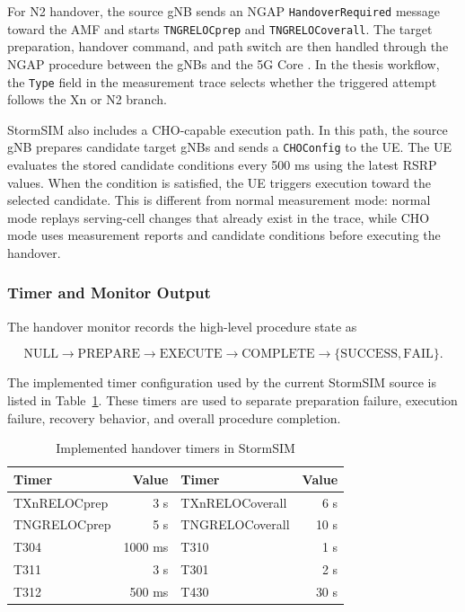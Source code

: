 For N2 handover, the source gNB sends an NGAP \texttt{HandoverRequired}
message toward the AMF and starts \texttt{TNGRELOCprep} and
\texttt{TNGRELOCoverall}. The target preparation, handover command, and path
switch are then handled through the NGAP procedure between the gNBs and the
5G Core \cite{3gpp_38413}. In the thesis workflow, the \texttt{Type} field in
the measurement trace selects whether the triggered attempt follows the Xn or
N2 branch.

StormSIM also includes a CHO-capable execution path. In this path, the source
gNB prepares candidate target gNBs and sends a \texttt{CHOConfig} to the UE.
The UE evaluates the stored candidate conditions every 500 ms using the latest
RSRP values. When the condition is satisfied, the UE triggers execution toward
the selected candidate. This is different from normal measurement mode: normal
mode replays serving-cell changes that already exist in the trace, while CHO
mode uses measurement reports and candidate conditions before executing the
handover.

\subsubsection{Timer and Monitor Output}

The handover monitor records the high-level procedure state as

\begin{equation}
\mathrm{NULL}\rightarrow\mathrm{PREPARE}\rightarrow\mathrm{EXECUTE}
\rightarrow\mathrm{COMPLETE}\rightarrow\{\mathrm{SUCCESS},\mathrm{FAIL}\}.
\end{equation}

The implemented timer configuration used by the current StormSIM source is
listed in Table~\ref{tab:stormsim-handover-timers}. These timers are used to
separate preparation failure, execution failure, recovery behavior, and overall
procedure completion.

\begin{table}[H]
\centering
\caption{Implemented handover timers in StormSIM}
\begin{tabular}{lrlr}
\toprule
Timer & Value & Timer & Value\\
\midrule
TXnRELOCprep & 3 s & TXnRELOCoverall & 6 s\\
TNGRELOCprep & 5 s & TNGRELOCoverall & 10 s\\
T304 & 1000 ms & T310 & 1 s\\
T311 & 3 s & T301 & 2 s\\
T312 & 500 ms & T430 & 30 s\\
\bottomrule
\end{tabular}
\label{tab:stormsim-handover-timers}
\end{table}

